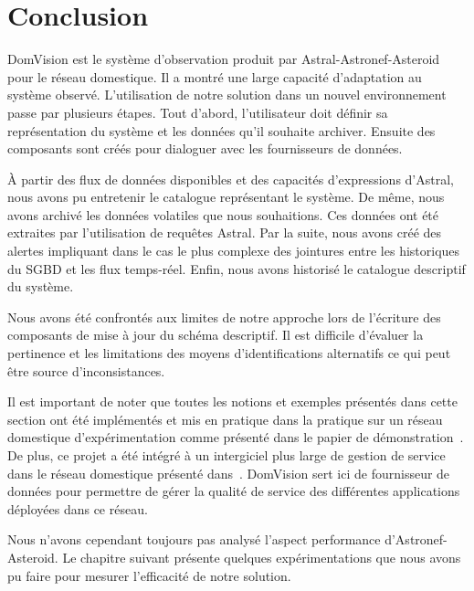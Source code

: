 \section{Conclusion}\label{sec:valid:domvision:conclusion}
DomVision est le système d'observation produit par Astral-Astronef-Asteroid pour le réseau domestique. Il a montré une large capacité d'adaptation au système observé. L'utilisation de notre solution dans un nouvel environnement passe par plusieurs étapes. Tout d'abord, l'utilisateur doit définir sa représentation du système et les données qu'il souhaite archiver. Ensuite des composants sont créés pour dialoguer avec les fournisseurs de données.

À partir des flux de données disponibles et des capacités d'expressions d'Astral, nous avons pu entretenir le catalogue représentant le système. De même, nous avons archivé les données volatiles que nous souhaitions. Ces données ont été extraites par l'utilisation de requêtes Astral. Par la suite, nous avons créé des alertes impliquant dans le cas le plus complexe des jointures entre les historiques du SGBD et les flux temps-réel. Enfin, nous avons historisé le catalogue descriptif du système.

Nous avons été confrontés aux limites de notre approche lors de l'écriture des composants de mise à jour du schéma descriptif. Il est difficile d'évaluer la pertinence et les limitations des moyens d'identifications alternatifs ce qui peut être source d'inconsistances.

Il est important de noter que toutes les notions et exemples présentés dans cette section ont été implémentés et mis en pratique dans la pratique sur un réseau domestique d'expérimentation comme présenté dans le papier de démonstration~\cite{Petit:domvision}. De plus, ce projet a été intégré à un intergiciel plus large de gestion de service dans le réseau domestique présenté dans~\cite{Kaed:insight}. DomVision sert ici de fournisseur de données pour permettre de gérer la qualité de service des différentes applications déployées dans ce réseau.

Nous n'avons cependant toujours pas analysé l'aspect performance d'Astronef-Asteroid. Le chapitre suivant présente quelques expérimentations que nous avons pu faire pour mesurer l'efficacité de notre solution.
